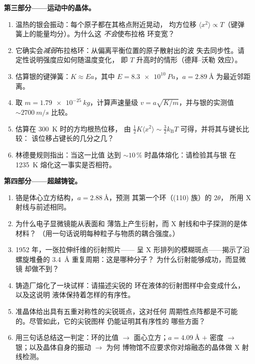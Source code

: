 \begin{problem}
\medskip\noindent\textbf{第三部分——运动中的晶体。}

\begin{enumerate}[resume]
  \item 温热的银会振动：每个原子都在其格点附近晃动，
        均方位移 $\langle x^2\rangle \propto T$（键弹簧上的能量均分）。为什么这
        \emph{不会}使布拉格
        环变宽？
  \item 它确实会\emph{减弱}布拉格环：从偏离平衡位置的原子散射出的波
        失去同步性。请定性说明强度应如何随温度变化，
        即 $T$ 升高时的情形（德拜–沃勒
        效应）。
  \item 估算银的键弹簧：$K \approx Ea$，其中
        $E = \qty{8.3e10}{Pa}$，$a = \qty{2.89}{\angstrom}$
        为最近邻距离。
  \item 取 $m = \qty{1.79e-25}{kg}$，计算声速量级
        $v = a\sqrt{K/m}$，并与银的实测值
        $\sim\qty{2700}{m/s}$ 比较。
  \item 估算在 \qty{300}{K} 时的方均根热位移，
        由 $\tfrac12K\langle x^2\rangle \sim
        \tfrac32k_{\text{B}}T$ 可得，并将其与键长比较：
        该位移占键长的几分之几？
  \item 林德曼规则指出：当这一比值
        达到 $\sim10\,\%$ 时晶体熔化：请检验其与银
        在 \qty{1235}{K} 熔化这一事实是否相符。
\end{enumerate}

\medskip\noindent\textbf{第四部分——超越铸锭。}

\begin{enumerate}[resume]
  \item 铬是体心立方结构，$a = \qty{2.88}{\angstrom}$，预测
        其第一个环（(110) 族）的 $2\theta$，
        所用 X 射线与前述相同。
  \item 为什么电子显微镜能从表面和
        薄箔上产生衍射，而 X 射线和中子探测的是体材料？
        （用一句话说明每种粒子与物质的耦合强度。）
  \item 1952 年，一张拉伸纤维的衍射照片——
        呈 X 形排列的模糊斑点——揭示了沿螺旋堆叠的
        \qty{3.4}{\angstrom} 重复周期：这是哪种分子？
        为什么衍射能够成功，而显微镜
        却做不到？
  \item 铸造厂熔化了一块试样：请描述尖锐的
        环在液体的衍射图样中会变成什么，以及这说明
        液体保持着怎样的有序性。
  \item 准晶体给出具有五重对称性的尖锐斑点，这对任何
        周期性点阵都是不可能的。尽管如此，它的尖锐图样
        仍能证明其有序性的
        哪些方面？
  \item 用三句话总结这一判定：环的比值
        $\to$ 面心立方；$a = \qty{4.09}{\angstrom}$ $+$ 密度 $\to$
        银；以及晶体自身的振动 $\to$ 为何
        博物馆不应要求你对熔融态的晶体做 X 射线检测。
\end{enumerate}
\end{problem}
